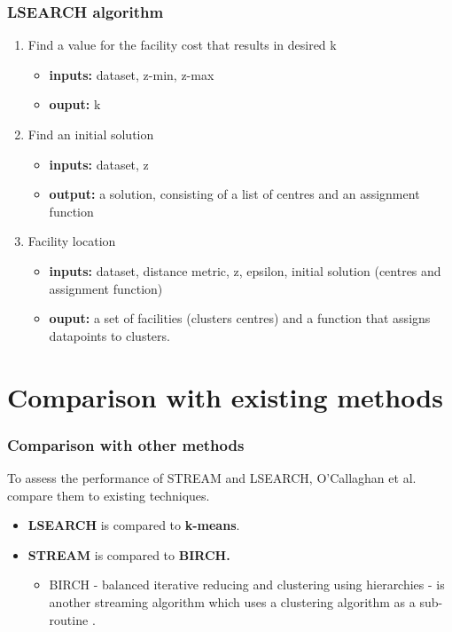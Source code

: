 \documentclass{beamer}
\begin{document}
\frame
    {
      \frametitle{LSEARCH algorithm}
      \begin{enumerate}
      \item Find a value for the facility cost that results in desired k
        \begin{itemize}
        \item {\bf inputs:} dataset, z-min, z-max
        \item {\bf ouput:} k
        \end{itemize}

      \item Find an initial solution
        \begin{itemize}
        \item {\bf inputs:} dataset, z
        \item {\bf output:} a solution, consisting of a list of
          centres and an assignment function
        \end{itemize}
        
      \item Facility location
        \begin{itemize}
        \item {\bf inputs:} dataset, distance metric, z, epsilon, initial solution (centres
        and assignment function)
        \item {\bf ouput:} a set of facilities (clusters centres) and a function
          that assigns datapoints to clusters.
        \end{itemize}
   \end{enumerate}
    }


\section{Comparison with existing methods}
\frame
{
  \frametitle{Comparison with other methods}
  To assess the performance of STREAM and LSEARCH, O'Callaghan et al. compare them to existing techniques.
  
  \bigskip 
  \begin{itemize}
  \item{\textbf{LSEARCH} is compared to \textbf{k-means}.}
  
  \bigskip
  \item{\textbf{STREAM} is compared to \textbf{BIRCH.}
    \begin{itemize}
      \item{BIRCH - balanced iterative reducing and clustering using hierarchies - is another streaming algorithm which uses a clustering algorithm as a sub-routine \cite{1996birch}.}
    \end{itemize}
  }
  	     
  \end{itemize}
}
\end{document}
